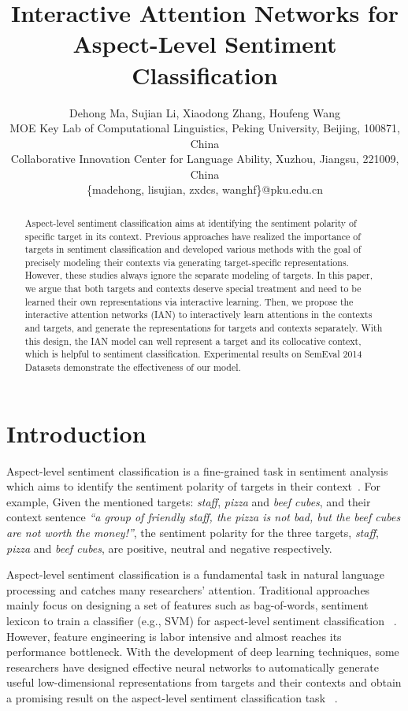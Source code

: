 \documentclass{article}
\title{Interactive Attention Networks for Aspect-Level Sentiment Classification}
\author{Dehong Ma, Sujian Li, Xiaodong Zhang, Houfeng Wang\\ 
MOE Key Lab of Computational Linguistics, Peking University, Beijing, 100871, China \\
Collaborative Innovation Center for Language Ability, Xuzhou, Jiangsu, 221009, China\\
\{madehong, lisujian, zxdcs, wanghf\}@pku.edu.cn}
\begin{document}
\maketitle

\begin{abstract}
Aspect-level sentiment classification aims at identifying the sentiment polarity of specific target in its context.
Previous approaches have realized the importance of targets in sentiment classification and developed various methods with the goal of precisely modeling their contexts via generating  target-specific representations.
However, these studies always ignore the separate modeling of targets.
In this paper, we argue that both targets and contexts deserve special treatment and need to be learned their own representations via interactive learning.
Then, we propose the  interactive attention networks (IAN) to interactively learn attentions in the contexts and targets, and generate the representations for targets and contexts separately.
With this design, the IAN model can well represent a target and its collocative context, which is helpful to sentiment classification.
Experimental results on SemEval 2014 Datasets demonstrate the effectiveness of our model.
\end{abstract}

\section{Introduction}
\label{section:intro}
Aspect-level sentiment classification is a fine-grained task in
sentiment analysis which aims to identify the sentiment polarity of 
targets in their context~\cite{INR-011,liu2012sentiment}. 
For example, 
Given the mentioned targets: \emph{staff}, \emph{pizza} and \emph{beef cubes}, and
their context sentence \emph{ ``a group of friendly staff, the pizza is not bad,
but the beef cubes are not worth the money!''}, 
the sentiment polarity for the three targets, \emph{staff}, \emph{pizza} and \emph{beef cubes}, are positive, neutral and negative respectively.

Aspect-level sentiment classification is a fundamental task in natural language processing and catches many researchers' attention. 
Traditional approaches mainly focus on designing a set of
features such as bag-of-words, sentiment lexicon to train a
classifier (e.g., SVM) for aspect-level sentiment classification
~\cite{jiang2011target,perez2012learning}.
However, feature engineering is labor intensive and almost reaches its performance bottleneck.
With the development of deep learning techniques, some
researchers have designed effective neural networks to
automatically generate useful low-dimensional representations from targets and their contexts and obtain a promising
result on the aspect-level sentiment classification task
~\cite{dong2014adaptive,vo2015target,wang2016attention,tang2016aspect}.
\end{document}
